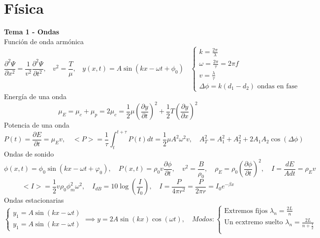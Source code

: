 \documentclass{article}
\begin{document}
\section{Física}
\textbf{Tema 1 - Ondas} \\
Función de onda armónica\\
\[
\frac{\partial^2 \Psi}{\partial x^2} = \frac{1}{v^2}\frac{\partial^2 \Psi}{\partial t^2}, \ \ \ \ v^2 = \frac{T}{\mu}, \ \ \ \ y(x, t)=A\sin (kx-\omega t + \phi_0) \ \ \ \ \begin{cases}
    k = \frac{2\pi}{\lambda}\\
    \omega = \frac{2\pi}{\tau} = 2\pi f\\
    v = \frac{\lambda}{\tau} \\
    \Delta \phi = k(d_1-d_2) \text{ ondas en fase}
\end{cases}
\]
Energía de una onda \\
\[
\mu_E = \mu_c + \mu_p = 2\mu_c = \frac{1}{2}\mu \left( \frac{\partial y}{\partial t} \right)^2 + \frac{1}{2}T \left( \frac{\partial y}{\partial x} \right)^2
\]
Potencia de una onda \\
\[
P(t) = \frac{\partial E}{\partial t} = \mu_E v, \hspace{1em}
<P> = \frac{1}{\tau} \int_t ^{t+\tau} P(t)dt = \frac{1}{2}\mu A^2 \omega^2 v, \hspace{1em}
A_T^2 = A_1^2+ A_2^2+ 2A_1A_2\cos( \Delta \phi)
\]
Ondas de sonido \\
\[
\phi(x, t)=\phi_0\sin (kx-\omega t +\varphi_0), \hspace{1em} 
P(x, t) = \rho_0 v \frac{\partial \phi}{\partial t}, \hspace{1em}
v^2 = \frac{B}{\rho_0}, \hspace{1em}
\rho_E = \rho_0 \left( \frac{\partial \phi}{\partial t}\right)^2, \hspace{1em}
I = \frac{dE}{Adt} = \rho_E v
\]
\[
<I> = \frac{1}{2}v \rho_0 \phi_m^2\omega^2, \hspace{1em}
I_{dB} = 10\log \left( \frac{I}{I_0} \right), \hspace{1em}
I = \frac{P}{4\pi r^2} = \frac{P}{2\pi r} = I_0e^{-\beta x}
\]
Ondas estacionarias \\
\[
\begin{cases}
    y_1 = A\sin(kx-\omega t) \\
    y_1 = A\sin(kx-\omega t)
\end{cases}
\implies y = 2A\sin(kx)\cos(\omega t), \hspace{1em}
Modos:
\begin{cases}
    \text{Extremos fijos } \lambda_n = \frac{2L}{n}\\
    \text{Un ecxtremo suelto } \lambda_n = \frac{2L}{n + \frac{1}{2}}\\
\end{cases}
\]
\end{document}
